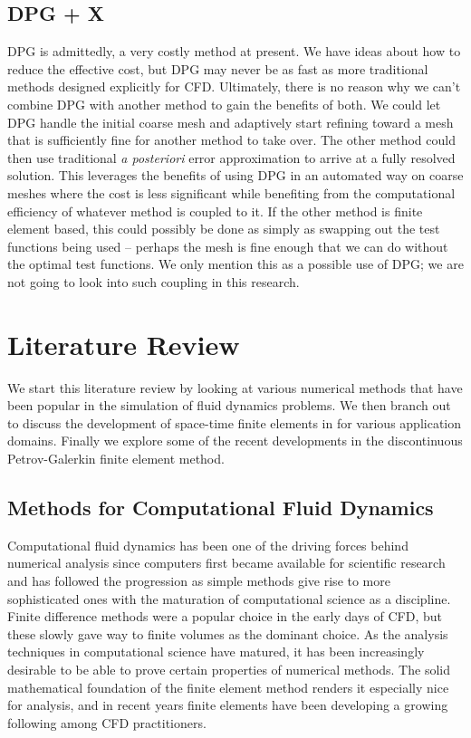 \documentclass[Proposal.tex]{subfiles}
\begin{document}
\subsection{DPG + X}
DPG is admittedly, a very costly method at present. 
We have ideas about how to reduce the effective cost, but DPG may never be as fast as more traditional methods designed explicitly for CFD.
Ultimately, there is no reason why we can't combine DPG with another method to gain the benefits of both.
We could let DPG handle the initial coarse mesh and adaptively start refining toward a mesh that is sufficiently fine for another method to take over.
The other method could then use traditional \emph{a posteriori} error approximation to arrive at a fully resolved solution.
This leverages the benefits of using DPG in an automated way on coarse meshes where the cost is less significant while benefiting from the 
computational efficiency of whatever method is coupled to it.
If the other method is finite element based, this could possibly be done as simply as swapping out the test functions being used 
-- perhaps the mesh is fine enough that we can do without the optimal test functions.
We only mention this as a possible use of DPG; we are not going to look into such coupling in this research.

\section{Literature Review}
We start this literature review by looking at various numerical methods that have been popular in the simulation of fluid dynamics problems.
We then branch out to discuss the development of space-time finite elements in for various application domains.
Finally we explore some of the recent developments in the discontinuous Petrov-Galerkin finite element method.

\subsection{Methods for Computational Fluid Dynamics}
Computational fluid dynamics has been one of the driving forces behind numerical analysis since computers first became available for
scientific research and has followed the progression as simple methods give rise to more sophisticated ones with the maturation of computational
science as a discipline.
Finite difference methods were a popular choice in the early days of CFD, but these slowly gave way to finite volumes as the dominant choice.
As the analysis techniques in computational science have matured, it has been increasingly desirable to be able to prove certain properties of
numerical methods.
The solid mathematical foundation of the finite element method renders it especially nice for analysis, and in recent years finite elements have 
been developing a growing following among CFD practitioners.
\end{document}
